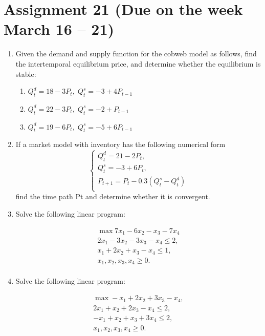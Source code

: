\documentclass[12pt]{article} %
\theoremstyle{definition} %
\begin{document}
\section*{Assignment 21 (Due on the week March 16 – 21)}

\begin{enumerate}

\item Given the demand and supply function for the cobweb model as follows, find the intertemporal
equilibrium price, and determine whether the equilibrium is stable:
\begin{enumerate}
\item $Q^d_t = 18 - 3P_t, \; Q^s_t = -3 + 4P_{t-1}$
\item $Q^d_t = 22 - 3P_t, \; Q^s_t = -2 + P_{t-1}$
\item $Q^d_t = 19 - 6P_t, \; Q^s_t = -5 + 6P_{t-1}$
\end{enumerate}


\item If a market model with inventory has the following numerical form
\[
\begin{cases}
Q^d_t = 21 - 2P_t, \\
Q^s_t = -3 + 6P_t, \\
P_{t+1} = P_t - 0.3(Q^s_t - Q^d_t) \\
\end{cases}
\]
find the time path Pt and determine whether it is convergent.

\item Solve the following linear program:

\[
\begin{array}{l}
\max 7x_1 - 6x_2 - x_3 - 7x_4 \\
2x_1 - 3x_2 - 3x_3 - x_4 \leq 2, \\
x_1 + 2x_2 + x_3 - x_4 \leq 1, \\
x_1, x_2, x_3, x_4 \geq 0. \\
\end{array}
\]

\item Solve the following linear program:

\[
\begin{array}{l}
\max -x_1 + 2x_2 + 3x_3 - x_4, \\
2x_1 + x_2 + 2x_3 - x_4 \leq 2, \\
-x_1 + x_2 + x_3 + 3x_4 \leq 2, \\
x_1, x_2, x_3, x_4 \geq 0. \\
\end{array}
\]


\end{enumerate}
\end{document}
